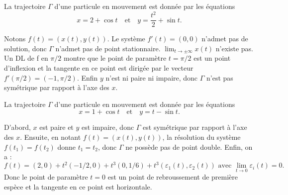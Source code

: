 \begin{question}
La trajectoire $\Gamma$ d'une particule en mouvement est donnée par les équations
$$x=2+\cos t\quad \mbox{et} \quad y=\frac{t^2}{2}+\sin t.$$
\begin{answers}  
\end{answers}
\begin{explanations}
Notons $f(t)=(x(t),y(t))$. Le système $f'(t)=(0,0)$ n'admet pas de solution, donc $\Gamma$ n'admet pas de point stationnaire. $\displaystyle \lim _{t\to \pm\infty}x(t)$ n'existe pas. Un DL de f en $\pi/2$ montre que le point de paramètre $t=\pi/2$ est un point d'inflexion et la tangente en ce point est dirigée par le vecteur $f'(\pi/2)=(-1,\pi/2)$. Enfin $y$ n'est ni paire ni impaire, donc $\Gamma$ n'est pas symétrique par rapport à l'axe des $x$.
\end{explanations}
\end{question}

\begin{question}
La trajectoire $\Gamma$ d'une particule en mouvement est donnée par les équations
$$x=1+\cos t\quad \mbox{et} \quad y=t-\sin t.$$
\begin{answers}  
\end{answers}
\begin{explanations}
D'abord, $x$ est paire et $y$ est impaire, donc $\Gamma$ est symétrique par rapport à l'axe des $x$. Ensuite, en notant $f(t)=(x(t),y(t))$, la résolution du système $f(t_1)=f(t_2)$ donne $t_1=t_2$, donc $\Gamma$ ne possède pas de point double. Enfin, on a :
$$f(t)=(2,0)+t^2(-1/2,0)+t^3(0,1/6)+t^3\left(\varepsilon_1(t),\varepsilon_2(t)\right)\mbox{ avec }\lim _{t\to 0}\varepsilon_i(t)=0.$$
Donc le point de paramètre $t=0$ est un point de rebroussement de première espèce et la tangente en ce point est horizontale.
\end{explanations}
\end{question}

